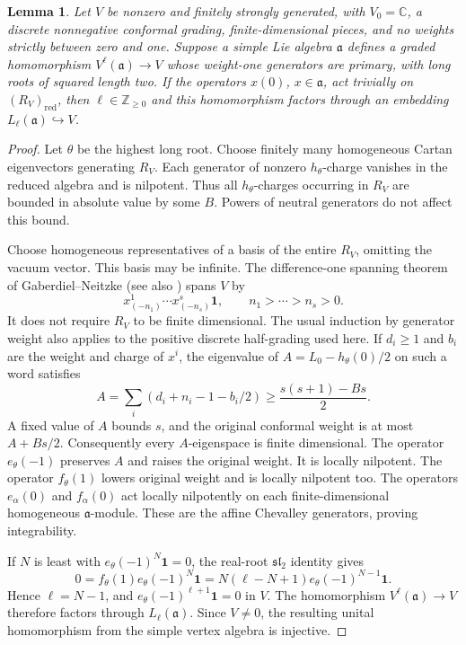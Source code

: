 \documentclass[11pt,a4paper]{amsart}
\numberwithin{equation}{section}
\newtheorem{lemma}[theorem]{Lemma}
\theoremstyle{definition}
\theoremstyle{remark}
\newcommand{\C}{\mathbb C}
\newcommand{\Z}{\mathbb Z}
\newcommand{\slg}{\mathfrak{sl}}
\begin{document}
\begin{lemma}\label{com:bounded-current}
Let $V$ be nonzero and finitely strongly generated, with $V_0=\C$,
a discrete nonnegative conformal grading, finite-dimensional pieces, and
no weights strictly between zero and one. Suppose a simple Lie algebra
$\mathfrak a$ defines a graded homomorphism $V^\ell(\mathfrak a)\to V$
whose weight-one generators are primary, with long roots of squared
length two. If the operators $x(0)$, $x\in\mathfrak a$, act trivially
on $(R_V)_{\mathrm{red}}$, then $\ell\in\Z_{\ge0}$ and this
homomorphism factors through an embedding
$L_\ell(\mathfrak a)\hookrightarrow V$.
\end{lemma}
\begin{proof}
Let $\theta$ be the highest long root. Choose finitely many homogeneous
Cartan eigenvectors generating $R_V$. Each generator of nonzero
$h_\theta$-charge vanishes in the reduced algebra and is nilpotent.
Thus all $h_\theta$-charges occurring in $R_V$ are bounded in absolute
value by some $B$. Powers of neutral generators do not affect this bound.

Choose homogeneous representatives of a basis of the entire $R_V$, omitting
the vacuum vector. This basis may be infinite. The difference-one spanning
theorem of Gaberdiel--Neitzke \cite[Proposition~8]{GaberdielNeitzke2003}
(see also \cite[Proposition~5.7]{Buhl2010}) spans $V$ by
$$
 x^1_{(-n_1)}\cdots x^s_{(-n_s)}\mathbf1,
 \qquad n_1>\cdots>n_s>0.
$$
It does not require $R_V$ to be finite dimensional. The usual induction
by generator weight also applies to the positive discrete half-grading
used here. If $d_i\ge1$ and $b_i$ are the weight and charge of $x^i$,
the eigenvalue of $A=L_0-h_\theta(0)/2$ on such a word satisfies
$$
 A=\sum_i(d_i+n_i-1-b_i/2)
 \ge\frac{s(s+1)-Bs}{2}.
$$
A fixed value of $A$ bounds $s$, and the original conformal weight is at
most $A+Bs/2$. Consequently every $A$-eigenspace is finite dimensional.
The operator $e_\theta(-1)$ preserves $A$ and raises the original weight.
It is locally nilpotent. The operator $f_\theta(1)$ lowers original
weight and is locally nilpotent too. The operators $e_\alpha(0)$ and $f_\alpha(0)$ act locally
nilpotently on each finite-dimensional homogeneous $\mathfrak a$-module. These are the affine
Chevalley generators, proving integrability.

If $N$ is least with $e_\theta(-1)^N\mathbf1=0$, the real-root
$\slg_2$ identity gives
$$
 0=f_\theta(1)e_\theta(-1)^N\mathbf1
   =N(\ell-N+1)e_\theta(-1)^{N-1}\mathbf1.
$$
Hence $\ell=N-1$, and
$e_\theta(-1)^{\ell+1}\mathbf1=0$ in $V$. The homomorphism
$V^\ell(\mathfrak a)\to V$ therefore factors through
$L_\ell(\mathfrak a)$. Since $V\ne0$, the resulting unital
homomorphism from the simple vertex algebra is injective.
\end{proof}
\end{document}
